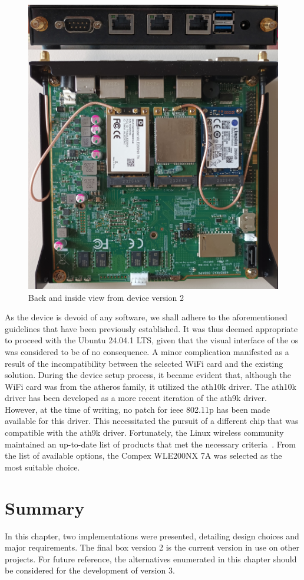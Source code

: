 \begin{figure}
	\centering
	\includegraphics[width=\textwidth]{Chapters/Figures/Implementation/devices/device_1.5.jpg}
	\caption{Back and inside view from device version 2}
	\label{fig:device_2}
\end{figure}


As the device is devoid of any software, we shall adhere to the aforementioned guidelines that have been previously established. It was thus deemed appropriate to proceed with the Ubuntu 24.04.1 LTS, given that the visual interface of the \gls{os} was considered to be of no consequence.
A minor complication manifested as a result of the incompatibility between the selected WiFi card and the existing solution. During the device setup process, it became evident that, although the WiFi card was from the atheros family, it utilized the ath10k driver. The ath10k driver has been developed as a more recent iteration of the ath9k driver. However, at the time of writing, no patch for \gls{ieee} 802.11p has been made available for this driver. This necessitated the pursuit of a different chip that was compatible with the ath9k driver. Fortunately, the Linux wireless community maintained an up-to-date list of products that met the necessary criteria~\cite{noauthor_external_nodate}. From the list of available options, the Compex WLE200NX 7A was selected as the most suitable choice.

\section{Summary}
\label{sec:summary}

In this chapter, two implementations were presented, detailing design choices and major requirements. The final box version 2 is the current version in use on other projects. For future reference, the alternatives enumerated in this chapter should be considered for the development of version 3.